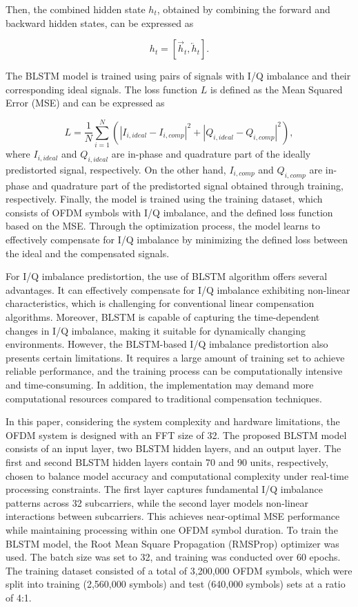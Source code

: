 \documentclass[lettersize,journal]{IEEEtran}
\begin{document}
Then, the combined hidden state $h_t$, obtained by combining the forward and backward hidden states, can be expressed as

\begin{equation}
\label{eq10}
h_t = [\overrightarrow{h}_t,\overleftarrow{h}_t].
\end{equation}

The BLSTM model is trained using pairs of signals with I/Q imbalance and their corresponding ideal signals.
The loss function $L$ is defined as the Mean Squared Error (MSE) and can be expressed as

\begin{equation}
\label{eq11}
L = \frac{1}{N} \sum_{i=1}^{N}(|I_{i,ideal}-I_{i,comp}|^2+|Q_{i,ideal}-Q_{i,comp}|^2),
\end{equation}
where $I_{i,ideal}$ and $Q_{i,ideal}$ are in-phase and quadrature part of the ideally predistorted signal, respectively.
On the other hand, $I_{i,comp}$ and $Q_{i,comp}$ are in-phase and quadrature part of the predistorted signal obtained through training, respectively.
Finally, the model is trained using the training dataset, which consists of OFDM symbols with I/Q imbalance, and the defined loss function based on the MSE. 
Through the optimization process, the model learns to effectively compensate for I/Q imbalance by minimizing the defined loss between the ideal and the compensated signals.

For I/Q imbalance predistortion, the use of BLSTM algorithm offers several advantages.
It can effectively compensate for I/Q imbalance exhibiting non-linear characteristics, which is challenging for conventional linear compensation algorithms.
Moreover, BLSTM is capable of capturing the time-dependent changes in I/Q imbalance, making it suitable for dynamically changing environments.
However, the BLSTM-based I/Q imbalance predistortion also presents certain limitations.
It requires a large amount of training set to achieve reliable performance, and the training process can be computationally intensive and time-consuming.
In addition, the implementation may demand more computational resources compared to traditional compensation techniques. 

In this paper, considering the system complexity and hardware limitations, the OFDM system is designed with an FFT size of 32.
The proposed BLSTM model consists of an input layer, two BLSTM hidden layers, and an output layer.
The first and second BLSTM hidden layers contain 70 and 90 units, respectively, chosen to balance model accuracy and computational complexity under real-time processing constraints.
The first layer captures fundamental I/Q imbalance patterns across 32 subcarriers, while the second layer models non-linear interactions between subcarriers.
This achieves near-optimal MSE performance while maintaining processing within one OFDM symbol duration.
To train the BLSTM model, the Root Mean Square Propagation (RMSProp) optimizer was used.
The batch size was set to 32, and training was conducted over 60 epochs.
The training dataset consisted of a total of 3,200,000 OFDM symbols, which were split into training (2,560,000 symbols) and test (640,000 symbols) sets at a ratio of 4:1.
\end{document}
